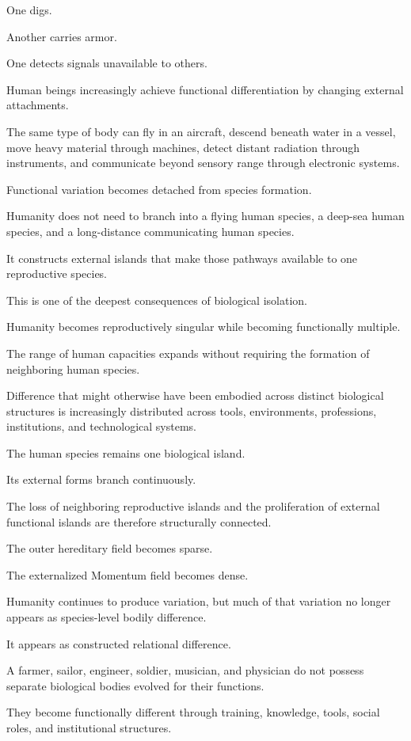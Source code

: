 One digs.

Another carries armor.

One detects signals unavailable to others.

Human beings increasingly achieve functional differentiation by changing external attachments.

The same type of body can fly in an aircraft, descend beneath water in a vessel, move heavy material through machines, detect distant radiation through instruments, and communicate beyond sensory range through electronic systems.

Functional variation becomes detached from species formation.

Humanity does not need to branch into a flying human species, a deep-sea human species, and a long-distance communicating human species.

It constructs external islands that make those pathways available to one reproductive species.

This is one of the deepest consequences of biological isolation.

Humanity becomes reproductively singular while becoming functionally multiple.

The range of human capacities expands without requiring the formation of neighboring human species.

Difference that might otherwise have been embodied across distinct biological structures is increasingly distributed across tools, environments, professions, institutions, and technological systems.

The human species remains one biological island.

Its external forms branch continuously.

The loss of neighboring reproductive islands and the proliferation of external functional islands are therefore structurally connected.

The outer hereditary field becomes sparse.

The externalized Momentum field becomes dense.

Humanity continues to produce variation, but much of that variation no longer appears as species-level bodily difference.

It appears as constructed relational difference.

A farmer, sailor, engineer, soldier, musician, and physician do not possess separate biological bodies evolved for their functions.

They become functionally different through training, knowledge, tools, social roles, and institutional structures.

